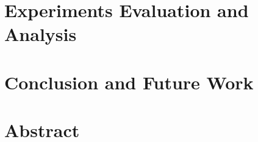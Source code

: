\documentclass[10pt]{report}
\begin{document}
\chapter{Experiments Evaluation and Analysis}


\chapter{Conclusion and Future Work}



% 
% 
\printbibliography


\chapter*{Abstract}

\end{document}
